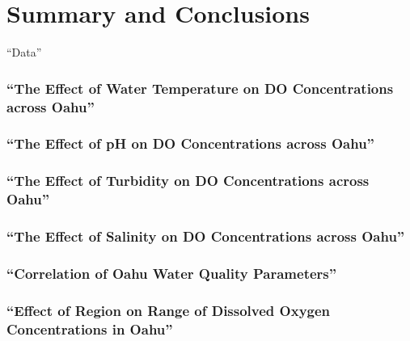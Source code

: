 \documentclass[12pt,]{article}
\begin{document}
\section{Summary and Conclusions}\label{summary-and-conclusions}

\newpage

\listoftables 

``Data'' \newpage
\listoffigures 

\subsubsection{\texorpdfstring{``The Effect of Water Temperature on DO
Concentrations across
Oahu''}{The Effect of Water Temperature on DO Concentrations across Oahu}}\label{the-effect-of-water-temperature-on-do-concentrations-across-oahu}

\subsubsection{\texorpdfstring{``The Effect of pH on DO Concentrations
across
Oahu''}{The Effect of pH on DO Concentrations across Oahu}}\label{the-effect-of-ph-on-do-concentrations-across-oahu}

\subsubsection{\texorpdfstring{``The Effect of Turbidity on DO
Concentrations across
Oahu''}{The Effect of Turbidity on DO Concentrations across Oahu}}\label{the-effect-of-turbidity-on-do-concentrations-across-oahu}

\subsubsection{\texorpdfstring{``The Effect of Salinity on DO
Concentrations across
Oahu''}{The Effect of Salinity on DO Concentrations across Oahu}}\label{the-effect-of-salinity-on-do-concentrations-across-oahu}

\subsubsection{\texorpdfstring{``Correlation of Oahu Water Quality
Parameters''}{Correlation of Oahu Water Quality Parameters}}\label{correlation-of-oahu-water-quality-parameters}

\subsubsection{\texorpdfstring{``Effect of Region on Range of Dissolved
Oxygen Concentrations in
Oahu''}{Effect of Region on Range of Dissolved Oxygen Concentrations in Oahu}}\label{effect-of-region-on-range-of-dissolved-oxygen-concentrations-in-oahu}
\end{document}
